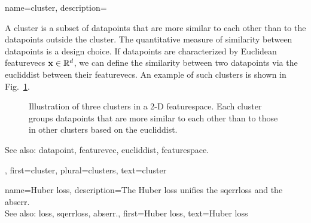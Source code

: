 {name={cluster},
	description={A cluster is a subset of 
		\glspl{datapoint} that are more similar to each other than to the \glspl{datapoint} outside the cluster. 
		The quantitative \gls{measure} of similarity between \glspl{datapoint} is a design choice. If \glspl{datapoint} 
		are characterized by Euclidean \glspl{featurevec} ${\bf x} \in \mathbb{R}^{d}$, 
		we can define the similarity between two \glspl{datapoint} via the \gls{eucliddist} between 
		their \glspl{featurevec}. An example of such clusters is shown in Fig.\ \ref{fig:clusters_dict}.
		\begin{figure}[H]
		\centering
		\caption{Illustration of three clusters in a 2-D \gls{featurespace}. Each cluster groups \glspl{datapoint} 
			that are more similar to each other than to those in other clusters based on the \gls{eucliddist}.}
			\label{fig:clusters_dict}
		\end{figure}
		See also: \gls{datapoint}, \gls{featurevec}, \gls{eucliddist}, \gls{featurespace}.},
	first={cluster},
	plural={clusters}, 
	text={cluster} 
}

{name={Huber loss}, 
	description={The 
		Huber \gls{loss} unifies the \gls{sqerrloss} and the \gls{abserr}.
				\\
		See also: \gls{loss}, \gls{sqerrloss}, \gls{abserr}.},
	first={Huber loss},
	text={Huber loss} 
}

